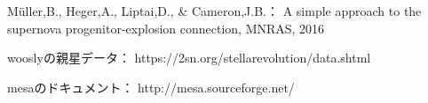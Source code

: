 \begin{bib}[100]

    M\"{u}ller,B., Heger,A., Liptai,D., \& Cameron,J.B.：
    \newblock A simple approach to the supernova progenitor-explosion connection,
    \newblock MNRAS, 2016
  
    wooslyの親星データ：
    \newblock https://2sn.org/stellarevolution/data.shtml

    mesaのドキュメント：
    \newblock http://mesa.sourceforge.net/

\end{bib}
